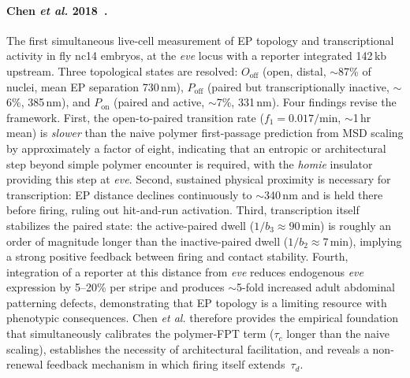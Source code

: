 \documentclass[11pt]{article}
\begin{document}
\paragraph{Chen \textit{et al.} 2018~\cite{Chen2018}.} The first
simultaneous live-cell measurement of EP topology and transcriptional
activity in fly nc14 embryos, at the \textit{eve} locus with a reporter
integrated 142\,kb upstream. Three topological states are resolved:
$O_{\mathrm{off}}$ (open, distal, $\sim$87\% of nuclei, mean EP separation
730\,nm), $P_{\mathrm{off}}$ (paired but transcriptionally inactive,
$\sim$6\%, 385\,nm), and $P_{\mathrm{on}}$ (paired and active, $\sim$7\%,
331\,nm). Four findings revise the framework. First, the open-to-paired
transition rate ($f_1 = 0.017\text{/min}$, $\sim$1\,hr mean) is
\emph{slower} than the naive polymer first-passage prediction from MSD
scaling by approximately a factor of eight, indicating that an entropic
or architectural step beyond simple polymer encounter is required, with
the \textit{homie} insulator providing this step at \textit{eve}. Second,
sustained physical proximity is necessary for transcription: EP distance
declines continuously to $\sim$340\,nm and is held there before firing,
ruling out hit-and-run activation. Third, transcription itself stabilizes
the paired state: the active-paired dwell ($1/b_3\approx 90$\,min) is
roughly an order of magnitude longer than the inactive-paired dwell
($1/b_2\approx 7$\,min), implying a strong positive feedback between
firing and contact stability. Fourth, integration of a reporter at this
distance from \textit{eve} reduces endogenous \textit{eve} expression by
5--20\% per stripe and produces $\sim$5-fold increased adult abdominal
patterning defects, demonstrating that EP topology is a limiting resource
with phenotypic consequences. Chen \textit{et al.} therefore provides the
empirical foundation that simultaneously calibrates the polymer-FPT term
($\tau_c$ longer than the naive scaling), establishes the necessity of
architectural facilitation, and reveals a non-renewal feedback mechanism
in which firing itself extends~$\tau_d$.
\end{document}
